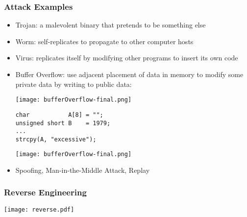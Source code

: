 \documentclass[
hyperref={pdfpagelabels=false}
,xcolor=table
]
{beamer}
\begin{document}




\begin{frame}[fragile]
  \frametitle{Attack Examples}
  \begin{itemize}
  \item Trojan: a malevolent binary that pretends to be something else
  \item Worm: self-replicates to propagate to other computer hosts
  \item Virus: replicates itself by modifying other programs to insert its own code
  \item Buffer Overflow: use adjacent placement of data in memory to modify some private data by writing to public data:
    \begin{center}
      \texttt{[image: bufferOverflow-final.png]}
\begin{verbatim}
char           A[8] = "";
unsigned short B    = 1979;
...
strcpy(A, "excessive");
\end{verbatim}
      \texttt{[image: bufferOverflow-final.png]}
    \end{center}
  \item Spoofing, Man-in-the-Middle Attack, Replay
  \end{itemize}
\end{frame}


\begin{frame}
  \frametitle{Reverse Engineering}
  \begin{center}
    \texttt{[image: reverse.pdf]}
  \end{center}
\end{frame}
\end{document}
